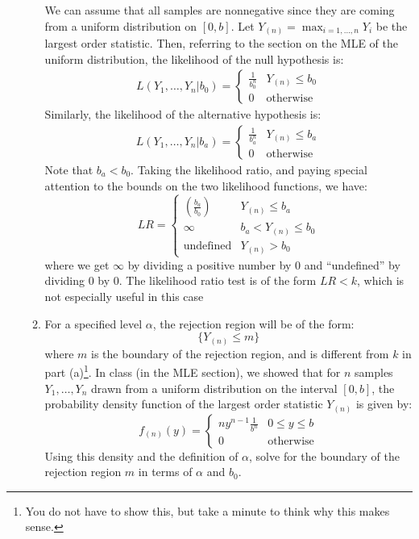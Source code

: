 \documentclass[12pt]{article}
\begin{document}
\begin{enumerate}
\begin{enumerate}
We can assume that all samples are nonnegative since they are coming from a uniform distribution on $[0, b]$. Let $Y_{(n)} = \max_{i = 1, \dots, n}Y_i$ be the largest order statistic. Then, referring to the section on the MLE of the uniform distribution, the likelihood of the null hypothesis is:
\begin{align*}
L(Y_1, \dots, Y_n | b_0) = \begin{cases}
\frac{1}{b_0^n} & Y_{(n)} \leq b_0 \\
0 & \text{otherwise}
\end{cases}
\end{align*}
Similarly, the likelihood of the alternative hypothesis is:
\begin{align*}
L(Y_1, \dots, Y_n | b_a) = \begin{cases}
\frac{1}{b_a^n} & Y_{(n)} \leq b_a \\
0 & \text{otherwise}
\end{cases}
\end{align*}
Note that $b_a < b_0$. Taking the likelihood ratio, and paying special attention to the bounds on the two likelihood functions, we have:
\[
LR = \begin{cases}
\left( \frac{b_a}{b_0} \right) & Y_{(n)} \leq b_a \\
\infty & b_a < Y_{(n)} \leq b_0 \\
\text{undefined} & Y_{(n)} > b_0
\end{cases}
\]
where we get $\infty$ by dividing a positive number by 0 and ``undefined'' by dividing 0 by 0. The likelihood ratio test is of the form $LR < k$, which is not especially useful in this case

\item For a specified level $\alpha$, the rejection region will be of the form:
\[
\{ Y_{(n)} \leq m \}
\]
where $m$ is the boundary of the rejection region, and is different from $k$ in part (a)\footnote{You do not have to show this, but take a minute to think why this makes sense.}. In class (in the MLE section), we showed that for $n$ samples $Y_1, \dots, Y_n$ drawn from a uniform distribution on the interval $[0, b]$, the probability density function of the largest order statistic $Y_{(n)}$ is given by:
\[
f_{(n)}(y) = \begin{cases}
n y^{n-1} \frac{1}{b^n} & 0 \leq y \leq b \\
0 & \text{otherwise}
\end{cases}
\]
Using this density and the definition of $\alpha$, solve for the boundary of the rejection region $m$ in terms of $\alpha$ and $b_0$. 
\end{enumerate}


\end{enumerate}
\end{document}
